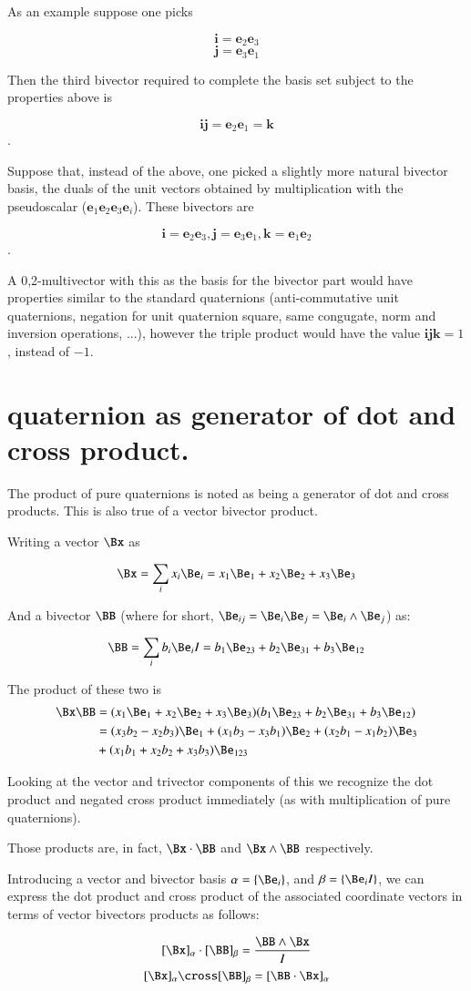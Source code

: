 \documentclass{article}      %
\begin{document}
As an example suppose one picks

\[
\mathbf{i} = \mathbf{e}_2\mathbf{e}_3
\]
\[
\mathbf{j} = \mathbf{e}_3\mathbf{e}_1
\]

Then the third bivector required to complete the basis set subject to the properties above is

\[
\mathbf{i}\mathbf{j} = \mathbf{e}_2\mathbf{e}_1 = \mathbf{k}
\].

Suppose that, instead of the above, one picked a slightly more natural bivector basis, the duals of the unit vectors obtained by multiplication with the pseudoscalar ($\mathbf{e}_1\mathbf{e}_2\mathbf{e}_3\mathbf{e}_i$).  These bivectors are

\[
\mathbf{i}=\mathbf{e}_2\mathbf{e}_3, \mathbf{j}=\mathbf{e}_3\mathbf{e}_1, \mathbf{k}=\mathbf{e}_1\mathbf{e}_2
\].

A 0,2-multivector with this as the basis for the bivector part would have properties similar to the standard quaternions (anti-commutative unit quaternions, negation for unit quaternion square, same congugate, norm and inversion operations, ...), however the triple product would have the value $\mathbf{i}\mathbf{j}\mathbf{k} = 1$, instead of $-1$.

\section{ quaternion as generator of dot and cross product. }

The product of pure quaternions is noted as being a generator of dot and cross products.  This is also true
of a vector bivector product.

Writing a vector $\Bx$ as

\[
\Bx = \sum_i x_i \Be_i = x_1 \Be_1 + x_2 \Be_2 + x_3 \Be_3
\]

And a bivector $\BB$ (where for short, $\Be_{ij} = \Be_i \Be_j = \Be_i \wedge \Be_j$) as:

\[
\BB = \sum_i b_i \Be_i I = b_1 \Be_{23} + b_2 \Be_{31} + b_3 \Be_{12}
\]

The product of these two is
\begin{align*}
\Bx \BB 
&= (x_1 \Be_1 + x_2 \Be_2 + x_3 \Be_3)(b_1 \Be_{23} + b_2 \Be_{31} + b_3 \Be_{12}) \\
&= (x_3 b_2 - x_2 b_3) \Be_1 + (x_1 b_3 - x_3 b_1) \Be_2 + (x_2 b_1 - x_1 b_2) \Be_3 \\
&+ (x_1 b_1 + x_2 b_2 + x_3 b_3) \Be_{123} \\
\end{align*}

Looking at the vector and trivector components of this we recognize the dot product and negated cross product
immediately (as with multiplication of pure quaternions).

Those products are, in fact, $\Bx \cdot \BB$ and $\Bx \wedge \BB$ respectively.

Introducing a vector and bivector basis $\alpha = \{ \Be_i \}$, and $\beta = \{ \Be_i I \}$, we can
express the dot product and cross product of the associated coordinate vectors
in terms of vector bivectors products as follows:

\[
[\Bx]_\alpha \cdot [\BB]_\beta = \frac{\BB \wedge \Bx}{I}
\]
\[
[\Bx]_\alpha \cross [\BB]_\beta = [\BB \cdot \Bx]_\alpha
\]
\end{document}
